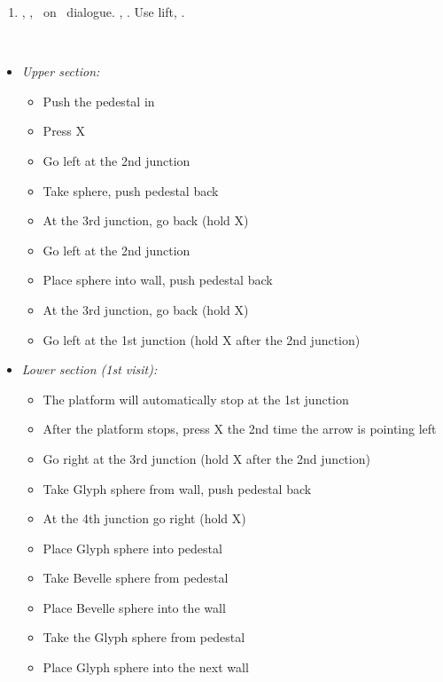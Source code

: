 \begin{enumerate}[resume]
    \item \sd, \skippablefmv[1:30], \sd\ on \yuna\ dialogue. \skippablefmv[30], \sd. Use lift, \sd.
\end{enumerate}
\bothvfill
\winvfill
\lossvfill
\ 
\begin{trial}
    \begin{itemize}
        \item \textit{Upper section:}
        \begin{itemize}
            \item Push the pedestal in
            \item Press X
            \item Go left at the 2nd junction
            \item Take sphere, push pedestal back
            \item At the 3rd junction, go back (hold X)
            \item Go left at the 2nd junction
            \item Place sphere into wall, push pedestal back
            \item At the 3rd junction, go back (hold X)
            \item Go left at the 1st junction (hold X after the 2nd junction)
        \end{itemize}
        \item \textit{Lower section (1st visit):}
        \begin{itemize}
            \item The platform will automatically stop at the 1st junction
            \item After the platform stops, press X the 2nd time the arrow is pointing left
            \item Go right at the 3rd junction (hold X after the 2nd junction)
            \item Take Glyph sphere from wall, push pedestal back
            \item At the 4th junction go right (hold X)
            \item Place Glyph sphere into pedestal
            \item Take Bevelle sphere from pedestal
            \item Place Bevelle sphere into the wall
            \item Take the Glyph sphere from pedestal
            \item Place Glyph sphere into the next wall

\end{itemize}
\end{itemize}
\end{trial}
